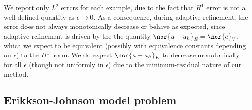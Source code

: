 We report only $L^2$ errors for each example, due to the fact that $H^1$ error is not a well-defined quantity as $\epsilon \rightarrow 0$.  As a consequence, during adaptive refinement, the error does not always monotonically decrease or behave as expected, since adaptive refinement is driven by the the quantity $\nor{u-u_h}_E = \nor{e}_V$, which we expect to be equivalent (possibly with equivalence constants depending on $\epsilon$) to the $H^1$ norm.  We do expect $\nor{u-u_h}_E$ to decrease monotonically for all $\epsilon$ (though not uniformly in $\epsilon$) due to the minimum-residual nature of our method.  

\subsection{Erikkson-Johnson model problem}

